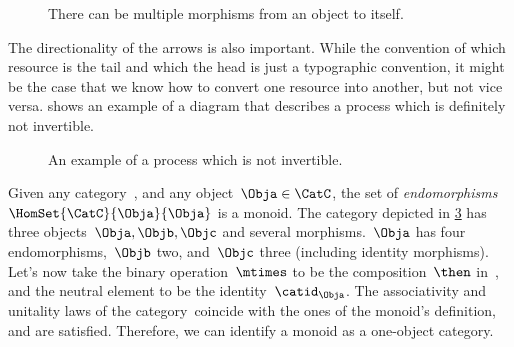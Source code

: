 \begin{figure}[h!]
	\centering
	\caption{There can be multiple morphisms from an object to itself.}
	\label{fig:e8}
\end{figure}

The directionality of the arrows is also important.
While the convention of which resource is the tail and which the head is just a typographic convention, it might be the case that we know how to convert one resource into another, but not vice versa.
 shows an example of a diagram that describes a process which is definitely not invertible.

\begin{figure}[h!]
	\centering
	\caption{An example of a process which is not invertible. }
	\label{fig:e10}
\end{figure}

\begin{example}
	Given any category~\CatC, and any object~$\Obja\in \CatC$, the set of \emph{endomorphisms}~$\HomSet{\CatC}{\Obja}{\Obja}$ is a monoid.
	The category depicted in \cref{fig:monoid_endomorphisms} has three objects~$\Obja,\Objb,\Objc$ and several morphisms.~$\Obja$ has four endomorphisms,~$\Objb$ two, and~$\Objc$ three (including identity morphisms).
	Let's now take the binary operation~$\mtimes$ to be the composition~$\then$ in~\CatC, and the neutral element to be the identity~$\catid_\Obja$.
	The associativity and unitality laws of the category~\CatC coincide with the ones of the monoid's definition, and are satisfied.
	Therefore, we can identify a monoid as a one-object category.
\end{example}

\begin{figure}[h!]
	\centering
	\caption{}
	\label{fig:monoid_endomorphisms}
\end{figure}

